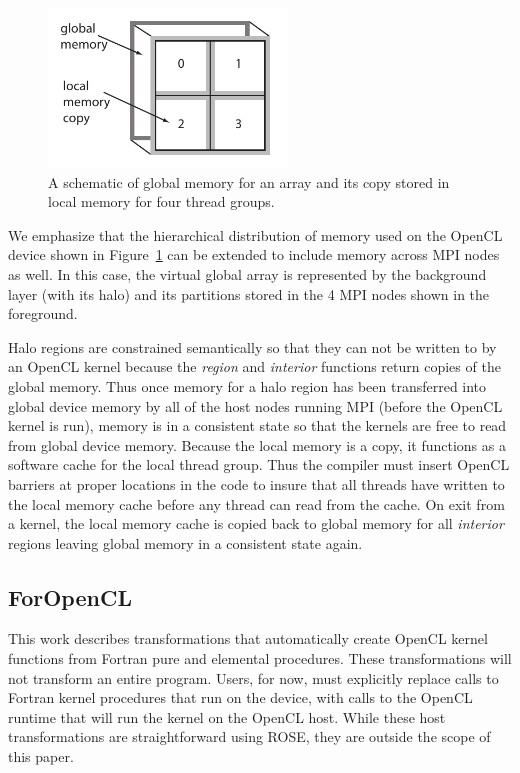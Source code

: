 \begin{figure}[!t]
\centering
\includegraphics[width=2.5in]{cl-memory.pdf}
\caption{A schematic of global memory for an array and its copy stored in local memory
for four thread groups.}
\label{fig:cl-memory}
\end{figure}

We emphasize that the hierarchical distribution of memory used on the OpenCL
device shown in Figure~\ref{fig:cl-memory} can be extended to include memory
across MPI nodes as well.  In this case, the virtual global array is
represented by the background layer (with its halo) and its partitions stored
in the 4 MPI nodes shown in the foreground.

Halo regions are constrained semantically so that they can not be written to
by an OpenCL kernel because the \emph{region} and \emph{interior} functions
return copies of the global memory.  Thus once memory for a halo region has
been transferred into global device memory by all of the host nodes running
MPI (before the OpenCL kernel is run), memory is in a consistent state so that
the kernels are free to read from global device memory.  Because the local
memory is a copy, it functions as a software cache for the local thread group.
Thus the compiler must insert OpenCL barriers at proper locations in the code
to insure that all threads have written to the local memory cache before any
thread can read from the cache.  On exit from a kernel, the local memory cache
is copied back to global memory for all \emph{interior} regions leaving global
memory in a consistent state again.

\subsection{ForOpenCL}

This work describes transformations that automatically create OpenCL kernel
functions from Fortran pure and elemental procedures.  These transformations
will not transform an entire program.  Users, for now, must explicitly replace
calls to Fortran kernel procedures that run on the device, with calls to the
OpenCL runtime that will run the kernel on the OpenCL host.  While these host
transformations are straightforward using ROSE, they are outside the scope of
this paper.

